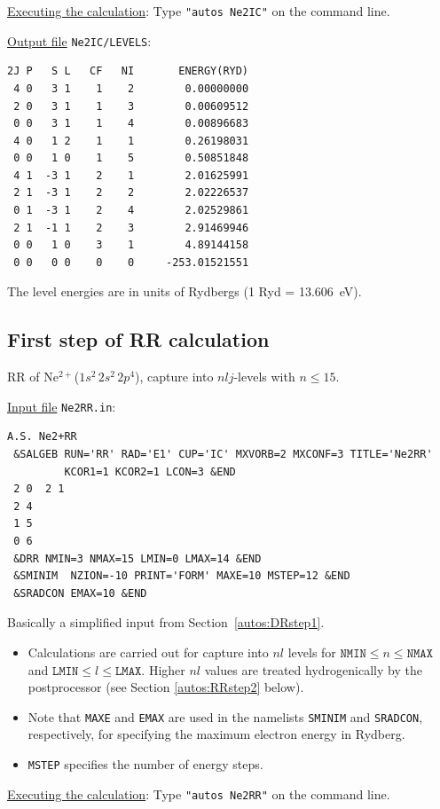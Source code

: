 \documentclass[a4paper,12pt]{article}
\begin{document}
\underline{Executing the calculation}: Type \texttt{"autos Ne2IC"} on the command line.

\underline{Output file} \texttt{Ne2IC/LEVELS}:
\begin{verbatim}
2J P   S L   CF   NI       ENERGY(RYD)
 4 0   3 1    1    2        0.00000000
 2 0   3 1    1    3        0.00609512
 0 0   3 1    1    4        0.00896683
 4 0   1 2    1    1        0.26198031
 0 0   1 0    1    5        0.50851848
 4 1  -3 1    2    1        2.01625991
 2 1  -3 1    2    2        2.02226537
 0 1  -3 1    2    4        2.02529861
 2 1  -1 1    2    3        2.91469946
 0 0   1 0    3    1        4.89144158
 0 0   0 0    0    0     -253.01521551
\end{verbatim}

The level energies are in units of Rydbergs (1 Ryd = 13.606~eV).

\subsection{First step of RR calculation}

RR of Ne$^{2+}$($1s^2\,2s^2\,2p^4$), capture into $nlj$-levels with $n\leq 15$.

\underline{Input file} \texttt{Ne2RR.in}:
\begin{verbatim}
A.S. Ne2+RR
 &SALGEB RUN='RR' RAD='E1' CUP='IC' MXVORB=2 MXCONF=3 TITLE='Ne2RR'
         KCOR1=1 KCOR2=1 LCON=3 &END
 2 0  2 1
 2 4
 1 5
 0 6
 &DRR NMIN=3 NMAX=15 LMIN=0 LMAX=14 &END
 &SMINIM  NZION=-10 PRINT='FORM' MAXE=10 MSTEP=12 &END
 &SRADCON EMAX=10 &END
\end{verbatim}

Basically a simplified input from Section~\ref{autos:DRstep1}. 
\begin{itemize}
\item Calculations are carried out for capture into $nl$ levels for $\texttt{NMIN} \leq n \leq \texttt{NMAX}$ and $\texttt{LMIN} \leq l\leq \texttt{LMAX}$. Higher $nl$ values are treated hydrogenically by the postprocessor (see Section \ref{autos:RRstep2} below).
\item Note that \texttt{MAXE} and \texttt{EMAX} are used in the namelists \texttt{SMINIM} and \texttt{SRADCON}, respectively, for specifying the maximum electron energy in Rydberg. 
\item \texttt{MSTEP} specifies the number of energy steps.
\end{itemize}

\underline{Executing the calculation}: Type \texttt{"autos Ne2RR"} on the command line.
\end{document}
